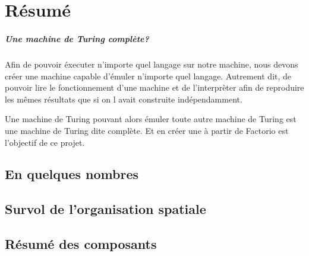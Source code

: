 \chapter{Résumé}

\paragraph{Une machine de Turing complète?}

Afin de pouvoir éxecuter n'importe quel langage sur notre machine, nous devons créer une machine capable d'émuler n'importe quel langage. Autrement dit, de pouvoir lire le fonctionnement d'une machine et de l'interprèter afin de reproduire les mêmes résultats que si on l avait construite indépendamment.

Une machine de Turing pouvant alors émuler toute autre machine de Turing est une machine de Turing dite complète.
Et en créer une à partir de Factorio est l'objectif de ce projet.

\section{En quelques nombres}

\section{Survol de l'organisation spatiale}

\section{Résumé des composants}
	